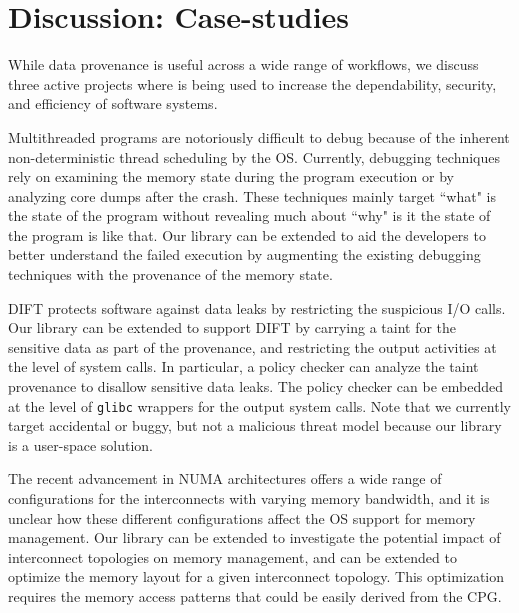 \section{Discussion: Case-studies}
\label{sec:discussion}
While data provenance is useful across a wide range of workflows, we discuss three active projects where \projecttitle is being used to increase the dependability, security, and efficiency of software systems. 

 Multithreaded programs are notoriously difficult to debug because of the inherent non-deterministic thread scheduling by the OS.  Currently, debugging techniques rely on examining the memory state during the program execution or by analyzing core dumps after the crash. These techniques mainly target ``what" is the state of the program without revealing much about ``why" is it the state of the program is like that. Our library can be extended to aid the developers to better understand the failed execution by augmenting the existing debugging techniques with the provenance of the memory state.



 DIFT protects software against data leaks by restricting the suspicious I/O calls. Our library can be extended to support DIFT by carrying a taint for the sensitive data as part of the provenance, and  restricting the output activities at the level of system calls. In particular, a policy checker can analyze the taint provenance to disallow sensitive data leaks. The policy checker can be embedded at the level of {\tt glibc} wrappers for the output system calls. Note that we currently target accidental or buggy, but not a malicious threat model because our library is a user-space solution.



 The recent advancement in NUMA architectures offers a wide range of configurations for the interconnects with varying memory bandwidth, and  it is unclear how these different configurations affect the OS support for memory management. Our library can be extended to investigate the potential impact of interconnect topologies on memory management, and can be extended to  optimize the memory layout for a given interconnect topology. This optimization requires the memory access patterns that could be easily derived from the CPG.


